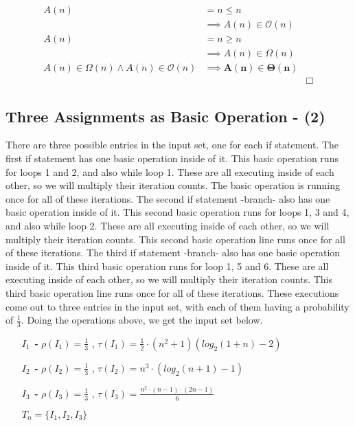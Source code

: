 \documentclass[10pt]{article}
\begin{document}
\begin{align*}
A(n) &= n \le n &\\
 &\implies A(n) \in \mathcal{O}(n) &\\
A(n) &= n \ge n &\\
 &\implies A(n) \in \Omega(n) &\\
 A(n) \in \Omega(n) \land A(n) \in \mathcal{O}(n) &\implies \mathbf{A(n) \boldsymbol{\in} \Theta(n)} &\\
 & &\Box
\end{align*}


\subsection{Three Assignments as Basic Operation - (2)}
\label{sec:real}

\indent \indent There are three possible entries in the input set, one for each if statement. The first if statement has one basic operation inside of it. This basic operation runs for loops 1 and 2, and also while loop 1. These are all executing inside of each other, so we will multiply their iteration counts. The basic operation is running once for all of these iterations. The second if statement -branch- also has one basic operation inside of it. This second basic operation runs for loops 1, 3 and 4, and also while loop 2. These are all executing inside of each other, so we will multiply their iteration counts. This second basic operation line runs once for all of these iterations. The third if statement -branch- also has one basic operation inside of it. This third basic operation runs for loop 1, 5 and 6. These are all executing inside of each other, so we will multiply their iteration counts. This third basic operation line runs once for all of these iterations. These executions come out to three entries in the input set, with each of them having a probability of $\frac{1}{3}$. Doing the operations above, we get the input set below. 

\begin{enumerate}[leftmargin=2.6cm]
    \item[\textit{\textbf{$I_{1}$ - }}] $\rho (\mathit{I_{1}}) = \frac{1}{3}$ ,  $\tau (\mathit{I_{1}})= \frac{1}{2} \cdot (n^2 + 1) (log_{2}(1 + n) - 2)$
    \item[\textit{\textbf{$I_{2}$ - }}] $\rho (\mathit{I_{2}}) = \frac{1}{3}$ ,  $\tau (\mathit{I_{2}}) = n^3 \cdot (log_2(n+1) - 1)$
    \item[\textit{\textbf{$I_{3}$ - }}] $\rho (\mathit{I_{3}}) = \frac{1}{3}$ ,  $\tau (\mathit{I_{3}}) = \frac{ n^2\cdot (n-1) \cdot (2n-1) } {6}$
    \item[] $T_{n} = \{I_{1}, I_{2}, I_{3}\}$
\end{enumerate}
\end{document}
